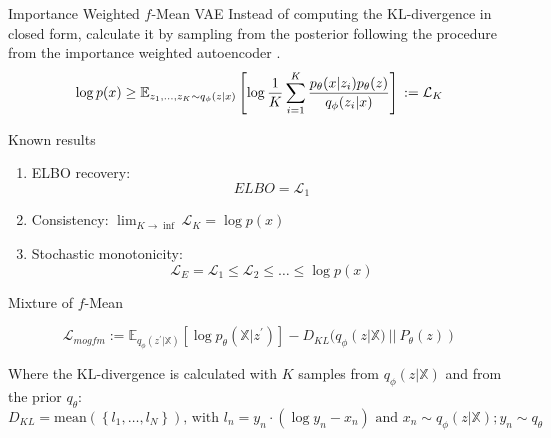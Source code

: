 \begin{frame}{Importance Weighted $f$-Mean VAE}
    Instead of computing the KL-divergence in closed form, calculate it by sampling from the posterior following the procedure from the importance weighted autoencoder \citep{burda_importance_2016, shi_variational_2019}.
    \begin{equation*}
        \log p(x) \geq \mathbb{E}_{z_1,\ldots,z_K \sim q_{\phi}(z|x)}\left[ \log \frac{1}{K} \sum ^K _{i=1} \frac{p_{\theta}(x|z_i)p_{\theta}(z)}{q_{\phi}(z_i| x)} \right]\\
        := \mathcal{L}_K
    \end{equation*}
\end{frame}

\begin{frame}{Known results \citep{nowozin_debiasing_2018}}
    \begin{enumerate}
        \item ELBO recovery:
        \begin{equation*}
            ELBO = \mathcal{L}_1
        \end{equation*}
        \item Consistency: $\lim _{K \rightarrow \inf} \mathcal{L}_K = \log p(x)$
        \item Stochastic monotonicity:
        \begin{equation*}
            \mathcal{L}_E = \mathcal{L}_1 \leq \mathcal{L}_2 \leq \ldots \leq \log p(x)
        \end{equation*}
    \end{enumerate}
\end{frame}

\begin{frame}{Mixture of $f$-Mean}
    \begin{figure}
        \centering
    \end{figure}

    \begin{equation*}
        \mathcal{L}_{mogfm} := \mathbb{E}_{q_{\phi}(z^{\prime}|\mathbb{X})}\left[ \log p_{\theta}(\mathbb{X}|z^{\prime}) \right] - D_{KL}(q_{\phi}(z|\mathbb{X})\ ||\ P_{\theta}(z))
    \end{equation*}

    Where the KL-divergence is calculated with $K$ samples from $q_{\phi}(z|\mathbb{X})$ and from the prior $q_{\theta}$:
    \begin{equation*}
        D_{KL} = \text{mean}(\left\{ l_1,\ldots,l_N \right\}) \text{, with } l_n=y_n\cdot(\log y_n -x_n) \text{ and } x_n \sim q_{\phi}(z|\mathbb{X}); y_n \sim q_{\theta}
    \end{equation*}
\end{frame}

